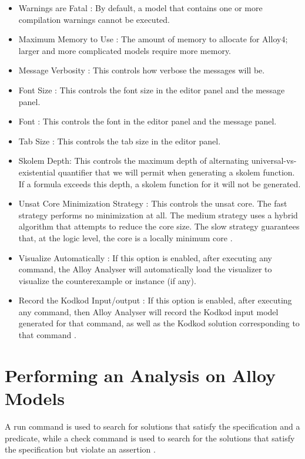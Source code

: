 \documentclass[a4paper,12pt]{report}
\begin{document}
\begin{onehalfspacing}
\begin{itemize}
\item Warnings are Fatal : By default, a model that contains one or more compilation warnings cannot be executed.
\item Maximum Memory to Use : The amount of memory to allocate for Alloy4; larger and more complicated models require more memory.
\item Message Verbosity : This controls how verbose the messages will be.
\item Font Size : This controls the font size in the editor panel and the message panel.
\item Font : This controls the font in the editor panel and the message panel.
\item Tab Size : This controls the tab size in the editor panel.
\item Skolem Depth: This controls the maximum depth of alternating universal-vs-existential quantifier that we will permit when generating a skolem function. If a formula exceeds this depth, a skolem function for it will not be generated\cite{DanielJackson2004}.
\item Unsat Core Minimization Strategy : This controls the unsat core. The fast strategy performs no minimization at all. The medium strategy uses a hybrid algorithm that attempts to reduce the core size. The slow strategy guarantees that, at the logic level, the core is a locally minimum core \cite{DanielJackson2004}.
\item Visualize Automatically : If this option is enabled, after executing any command, the Alloy Analyser will automatically load the visualizer to visualize the counterexample or instance (if any)\cite{DanielJackson2004}.
\item Record the Kodkod Input/output : If this option is enabled, after executing any command, then Alloy Analyser will record the Kodkod input model generated for that command, as well as the Kodkod solution corresponding to that command \cite{DanielJackson2004}.
\end{itemize}

\section{Performing an Analysis on Alloy Models}
\label{Alloy Performance}

A run command is used to search for solutions that satisfy the specification and a predicate, while a check command is used to search for the solutions that satisfy the specification but violate an assertion \cite{DanielJackson2004}.


\end{onehalfspacing}
\end{document}
